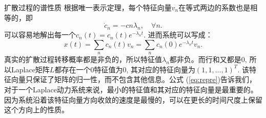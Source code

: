\begin{frame}{扩散过程的谱性质}
    根据唯一表示定理，每个特征向量$v_n$在等式两边的系数也是相等的，即\begin{equation}
    \dot{c}_n = -cn\lambda_n,\quad \forall n.
\end{equation}可以容易地解出每一个$c_n(t) = c_n(t) e^{-\lambda_n t}$. 进而系统可以写成：\begin{equation}
    x(t) = \sum_n c_n(t) v_n = \sum_n c_n(0)e^{-\lambda_n t} v_n. 
    \label{eq:repre}
\end{equation}真实的扩散过程转移概率都是非负的，所以特征值$\lambda_{n}$都非负。而行和又都是$0$, 所以Laplace矩阵$L$都存在一个$0$特征值为$0$, 其对应的特征向量为$(1,1,\dots, 1)^{T}$. 该特征向量只保证了矩阵的归一性，而不包含其他信息。公式 (\ref{eq:repre})告诉我们，对于一个Laplace动力系统来说，最小的特征值和其对应的特征向量是最重要的。因为系统沿着该特征向量方向收敛的速度是最慢的，可以在更长的时间尺度上保留这个方向上的性质。
\end{frame}






